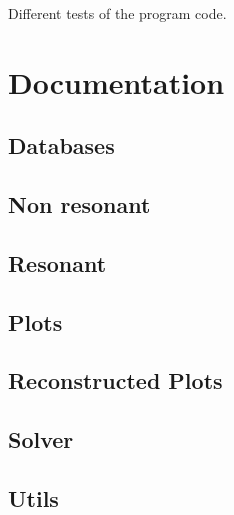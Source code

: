 \documentclass[openany]{book}
\begin{document}
Different tests of the program code. 

\section{Documentation} \label{sec:documentation}

\subsection{Databases} \label{sub:codesDatabases}

\subsection{Non resonant} \label{sub:codesNonResonant}
\subsection{Resonant} \label{sub:codesResonant}
\subsection{Plots} \label{sub:codesPlots}
\subsection{Reconstructed Plots} \label{sub:codesReconstructedPlots}
\subsection{Solver} \label{sub:codesSolver}
\subsection{Utils} \label{sub:codesUtils}

\newpage


\end{document}
